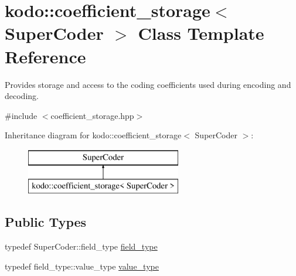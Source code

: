 \hypertarget{classkodo_1_1coefficient__storage}{\section{kodo\-:\-:coefficient\-\_\-storage$<$ Super\-Coder $>$ Class Template Reference}
\label{classkodo_1_1coefficient__storage}
}


Provides storage and access to the coding coefficients used during encoding and decoding.  




{\ttfamily \#include $<$coefficient\-\_\-storage.\-hpp$>$}

Inheritance diagram for kodo\-:\-:coefficient\-\_\-storage$<$ Super\-Coder $>$\-:\begin{figure}[H]
\begin{center}
\leavevmode
\includegraphics[height=2.000000cm]{classkodo_1_1coefficient__storage}
\end{center}
\end{figure}
\subsection*{Public Types}
\begin{DoxyCompactItemize}
\item 
typedef Super\-Coder\-::field\-\_\-type \hyperlink{classkodo_1_1coefficient__storage_ac326eea1a6bb406c53adbdb6d8e6355b}{field\-\_\-type}
\begin{DoxyCompactList}\small\item\em \end{DoxyCompactList}\item 
typedef field\-\_\-type\-::value\-\_\-type \hyperlink{classkodo_1_1coefficient__storage_a20cb74e084e77c6c15b176e01f555b1c}{value\-\_\-type}
\begin{DoxyCompactList}\small\item\em \end{DoxyCompactList}\end{DoxyCompactItemize}
